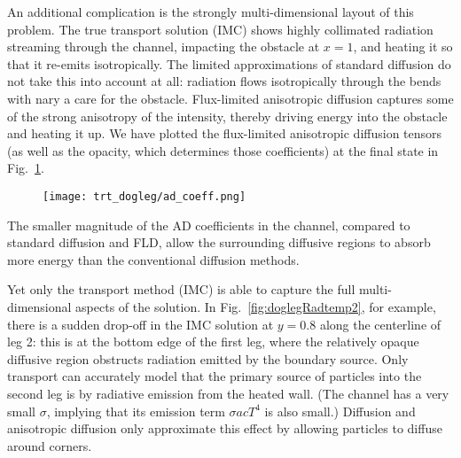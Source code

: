 \thesisclearpage

An additional complication is the strongly multi-dimensional layout of this
problem. The true transport solution (IMC) shows highly collimated radiation
streaming through the channel, impacting the obstacle at $x=1$, and heating it
so that it re-emits isotropically. The limited approximations of standard
diffusion do not take this into
account at all: radiation flows isotropically through the bends with nary a care
for the obstacle. Flux-limited anisotropic diffusion captures some of the
strong anisotropy of the intensity, thereby driving energy into the obstacle and
heating it up.
We have plotted the flux-limited anisotropic diffusion tensors (as well as
the opacity, which determines those coefficients) at the final state in
Fig.~\ref{fig:doglegAdcoeffFinal}. 
%
\begin{figure}[tbh]
  \centering
  \hspace{-.5in}%
  \texttt{[image: trt\_dogleg/ad\_coeff.png]}
  \label{fig:doglegAdcoeffFinal}
\end{figure}
%
The smaller magnitude of the AD coefficients in the channel, compared to
standard diffusion and FLD, allow the surrounding diffusive regions to
absorb more energy than the conventional diffusion methods.

Yet only the transport
method (IMC) is able to capture the full multi-dimensional aspects of the
solution. In Fig.~\ref{fig:doglegRadtemp2}, for example, there is a sudden
drop-off in the IMC solution at $y=0.8$ along the centerline of leg 2: this is
at the bottom edge of the first leg, where the relatively opaque diffusive
region obstructs radiation emitted by the boundary source. Only transport can
accurately
model that the primary source of particles into the second leg is by radiative
emission from the heated wall. (The channel has a very small $\sigma$, implying
that  
its emission term $\sigma a c T^4$ is also small.) Diffusion and anisotropic
diffusion only approximate this effect by allowing particles to diffuse around
corners.

